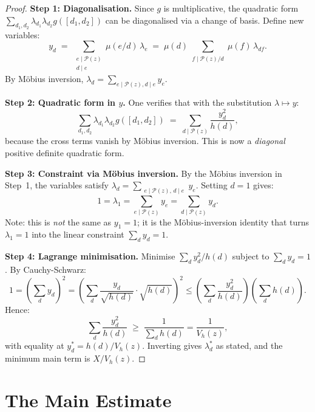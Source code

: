 \documentclass[12pt,a4paper]{amsart}
\theoremstyle{definition}
\begin{document}
\begin{proof}
  \textbf{Step 1: Diagonalisation.}
  Since $g$ is multiplicative, the quadratic form $\sum_{d_1, d_2} \lambda_{d_1}\lambda_{d_2} g([d_1,d_2])$
  can be diagonalised via a change of basis.  Define new variables:
  \[
    y_d \;=\; \sum_{\substack{e \mid \mathcal{P}(z) \\ d \mid e}} \mu(e/d)\, \lambda_e
           \;=\; \mu(d) \sum_{\substack{f \mid \mathcal{P}(z)/d}} \mu(f)\, \lambda_{df}.
  \]
  By M\"obius inversion, $\lambda_d = \sum_{e \mid \mathcal{P}(z), d \mid e} y_e$.

  \textbf{Step 2: Quadratic form in $y$.}
  One verifies that with the substitution $\lambda \mapsto y$:
  \[
    \sum_{d_1, d_2} \lambda_{d_1}\lambda_{d_2} g([d_1,d_2])
    \;=\; \sum_{d \mid \mathcal{P}(z)} \frac{y_d^2}{h(d)},
  \]
  because the cross terms vanish by M\"obius inversion.  This is now a
  \emph{diagonal} positive definite quadratic form.

  \textbf{Step 3: Constraint via M\"{o}bius inversion.}
  By the M\"{o}bius inversion in Step~1, the variables satisfy
  $\lambda_d = \sum_{\substack{e \mid \mathcal{P}(z),\, d \mid e}} y_e$.
  Setting $d = 1$ gives:
  \[
    1 = \lambda_1 = \sum_{e \mid \mathcal{P}(z)} y_e = \sum_{d \mid \mathcal{P}(z)} y_d.
  \]
  Note: this is \emph{not} the same as $y_1 = 1$; it is the Möbius-inversion
  identity that turns $\lambda_1 = 1$ into the linear constraint $\sum_d y_d = 1$.

  \textbf{Step 4: Lagrange minimisation.}
  Minimise $\sum_d y_d^2/h(d)$ subject to $\sum_d y_d = 1$.  By Cauchy-Schwarz:
  \[
    1 = \left(\sum_d y_d\right)^2
    = \left(\sum_d \frac{y_d}{\sqrt{h(d)}} \cdot \sqrt{h(d)}\right)^2
    \leq \left(\sum_d \frac{y_d^2}{h(d)}\right)\left(\sum_d h(d)\right).
  \]
  Hence:
  \[
    \sum_d \frac{y_d^2}{h(d)} \;\geq\; \frac{1}{\sum_d h(d)} = \frac{1}{V_h(z)},
  \]
  with equality at $y_d^* = h(d) / V_h(z)$.  Inverting gives $\lambda_d^*$
  as stated, and the minimum main term is $X/V_h(z)$.
\end{proof}

\section{The Main Estimate}
\label{sec:main}
\end{document}
